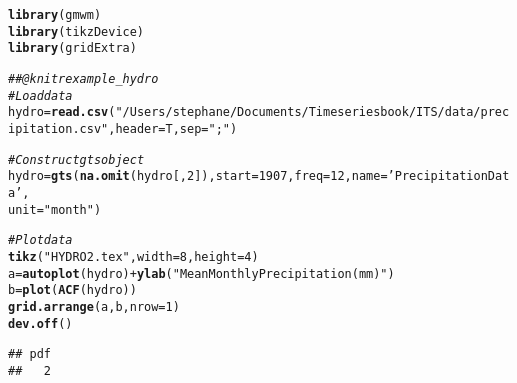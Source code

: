 \documentclass{article}\usepackage[]{graphicx}\usepackage[]{color}
\makeatletter
\newcommand{\hlnum}[1]{\textcolor[rgb]{0.686,0.059,0.569}{#1}}%
\newcommand{\hlstr}[1]{\textcolor[rgb]{0.192,0.494,0.8}{#1}}%
\newcommand{\hlcom}[1]{\textcolor[rgb]{0.678,0.584,0.686}{\textit{#1}}}%
\newcommand{\hlopt}[1]{\textcolor[rgb]{0,0,0}{#1}}%
\newcommand{\hlstd}[1]{\textcolor[rgb]{0.345,0.345,0.345}{#1}}%
\newcommand{\hlkwb}[1]{\textcolor[rgb]{0.69,0.353,0.396}{#1}}%
\newcommand{\hlkwc}[1]{\textcolor[rgb]{0.333,0.667,0.333}{#1}}%
\newcommand{\hlkwd}[1]{\textcolor[rgb]{0.737,0.353,0.396}{\textbf{#1}}}%
\newenvironment{kframe}{%
 \def\at@end@of@kframe{}%
 \ifinner\ifhmode%
  \def\at@end@of@kframe{\end{minipage}}%
  \begin{minipage}{\columnwidth}%
 \fi\fi%
 \def\FrameCommand##1{\hskip\@totalleftmargin \hskip-\fboxsep
 \colorbox{shadecolor}{##1}\hskip-\fboxsep
     \hskip-\linewidth \hskip-\@totalleftmargin \hskip\columnwidth}%
 \MakeFramed {\advance\hsize-\width
   \@totalleftmargin\z@ \linewidth\hsize
   \@setminipage}}%
 {\par\unskip\endMakeFramed%
 \at@end@of@kframe}
\newenvironment{knitrout}{}{} %
\makeatother
\begin{document}
\begin{knitrout}
\color{fgcolor}\begin{kframe}
\begin{alltt}
\hlkwd{library}\hlstd{(gmwm)}
\hlkwd{library}\hlstd{(tikzDevice)}
\hlkwd{library}\hlstd{(gridExtra)}

\hlcom{## @knitr example_hydro}
\hlcom{# Load data}
\hlstd{hydro} \hlkwb{=} \hlkwd{read.csv}\hlstd{(}\hlstr{"/Users/stephane/Documents/Time series book/ITS/data/precipitation.csv"}\hlstd{,} \hlkwc{header}\hlstd{=T,} \hlkwc{sep}\hlstd{=}\hlstr{";"}\hlstd{)}

\hlcom{# Construct gts object}
\hlstd{hydro} \hlkwb{=} \hlkwd{gts}\hlstd{(}\hlkwd{na.omit}\hlstd{(hydro[,}\hlnum{2}\hlstd{]),} \hlkwc{start} \hlstd{=} \hlnum{1907}\hlstd{,} \hlkwc{freq} \hlstd{=} \hlnum{12}\hlstd{,} \hlkwc{name} \hlstd{=} \hlstr{'Precipitation Data'}\hlstd{,}
            \hlkwc{unit} \hlstd{=} \hlstr{"month"}\hlstd{)}

\hlcom{# Plot data}
\hlkwd{tikz}\hlstd{(}\hlstr{"HYDRO2.tex"}\hlstd{,} \hlkwc{width} \hlstd{=} \hlnum{8}\hlstd{,} \hlkwc{height} \hlstd{=} \hlnum{4}\hlstd{)}
\hlstd{a} \hlkwb{=} \hlkwd{autoplot}\hlstd{(hydro)}  \hlopt{+}  \hlkwd{ylab}\hlstd{(}\hlstr{"Mean Monthly Precipitation (mm)"}\hlstd{)}
\hlstd{b} \hlkwb{=} \hlkwd{plot}\hlstd{(}\hlkwd{ACF}\hlstd{(hydro))}
\hlkwd{grid.arrange}\hlstd{(a, b,} \hlkwc{nrow} \hlstd{=} \hlnum{1}\hlstd{)}
\hlkwd{dev.off}\hlstd{()}
\end{alltt}
\begin{verbatim}
## pdf 
##   2
\end{verbatim}
\end{kframe}
\end{knitrout}
\end{document}
